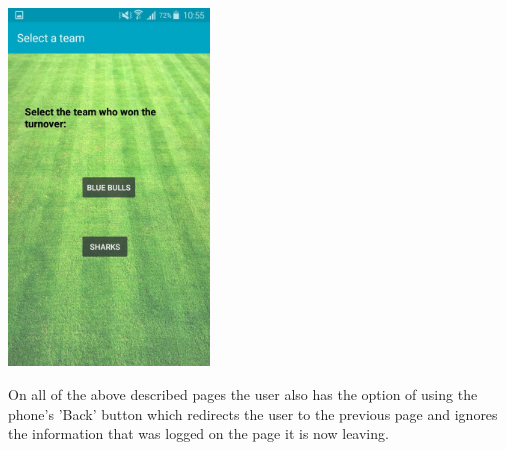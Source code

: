 \documentclass[hidelinks,a4paper,12pt]{article}
\begin{document}
		\begin{center}
  			 \includegraphics[width=0.4\textwidth] {./images/choose_turnover.jpg}\\[0.4cm]
		\end{center}

	On all of the above described pages the user also has the option of using the phone's  'Back' button which redirects the user to the previous page and ignores the information that was logged on the page it is now leaving.

\newpage
\end{document}

